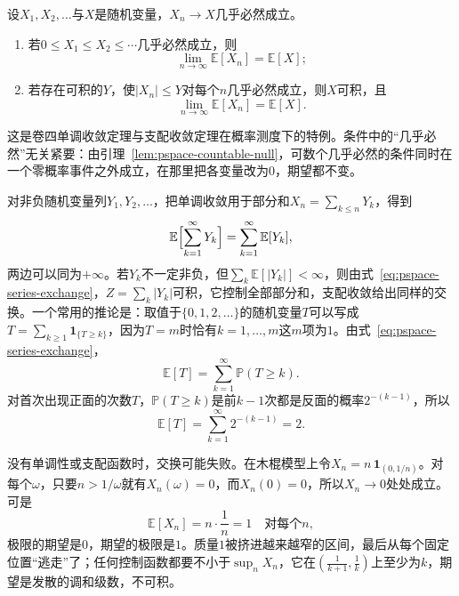 \begin{theorem}[单调收敛与支配收敛]
\label{thm:pspace-convergence}
设$X_1,X_2,\dots$与$X$是随机变量，$X_n\to X$几乎必然成立。
\begin{enumerate}
  \item 若$0\leq X_1\leq X_2\leq\cdots$几乎必然成立，则
  \begin{equation}
    \lim_{n\to\infty}\mathbb{E}[X_n]=\mathbb{E}[X];
    \label{eq:pspace-monotone-convergence}
  \end{equation}
  \item 若存在可积的$Y$，使$\lvert X_n\rvert\leq Y$对每个$n$几乎必然成立，则$X$可积，且
  \begin{equation}
    \lim_{n\to\infty}\mathbb{E}[X_n]=\mathbb{E}[X].
    \label{eq:pspace-dominated-convergence}
  \end{equation}
\end{enumerate}
\end{theorem}

这是卷四单调收敛定理与支配收敛定理在概率测度下的特例。条件中的“几乎必然”无关紧要：由引理~\ref{lem:pspace-countable-null}，可数个几乎必然的条件同时在一个零概率事件之外成立，在那里把各变量改为$0$，期望都不变。

对非负随机变量列$Y_1,Y_2,\dots$，把单调收敛用于部分和$X_n=\sum_{k\leq n}Y_k$，得到
\begin{equation}
  \mathbb{E}\Bigl[\sum_{k=1}^{\infty}Y_k\Bigr]=\sum_{k=1}^{\infty}\mathbb{E}[Y_k],
  \label{eq:pspace-series-exchange}
\end{equation}
两边可以同为$+\infty$。若$Y_k$不一定非负，但$\sum_k\mathbb{E}[\lvert Y_k\rvert]<\infty$，则由式~\eqref{eq:pspace-series-exchange}，$Z=\sum_k\lvert Y_k\rvert$可积，它控制全部部分和，支配收敛给出同样的交换。一个常用的推论是：取值于$\{0,1,2,\dots\}$的随机变量$T$可以写成$T=\sum_{k\geq1}\mathbf{1}_{\{T\geq k\}}$，因为$T=m$时恰有$k=1,\dots,m$这$m$项为$1$。由式~\eqref{eq:pspace-series-exchange}，
\[
  \mathbb{E}[T]=\sum_{k=1}^{\infty}\mathbb{P}(T\geq k).
\]
对首次出现正面的次数$T$，$\mathbb{P}(T\geq k)$是前$k-1$次都是反面的概率$2^{-(k-1)}$，所以
\[
  \mathbb{E}[T]=\sum_{k=1}^{\infty}2^{-(k-1)}=2 .
\]

没有单调性或支配函数时，交换可能失败。在木棍模型上令$X_n=n\,\mathbf{1}_{(0,1/n)}$。对每个$\omega$，只要$n>1/\omega$就有$X_n(\omega)=0$，而$X_n(0)=0$，所以$X_n\to0$处处成立。可是
\[
  \mathbb{E}[X_n]=n\cdot\frac1n=1\quad\text{对每个}n,
\]
极限的期望是$0$，期望的极限是$1$。质量$1$被挤进越来越窄的区间，最后从每个固定位置“逃走”了；任何控制函数都要不小于$\sup_nX_n$，它在$(\frac1{k+1},\frac1k)$上至少为$k$，期望是发散的调和级数，不可积。

